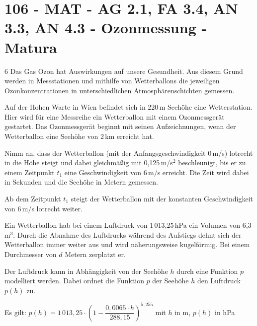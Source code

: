 \section{106 - MAT - AG 2.1, FA 3.4, AN 3.3, AN 4.3 - Ozonmessung - Matura}

\begin{langesbeispiel}\item[6] %
Das Gas Ozon hat Auswirkungen auf unsere Gesundheit. Aus diesem Grund werden in Messstationen und mithilfe von Wetterballons die jeweiligen Ozonkonzentrationen in unterschiedlichen Atmosphärenschichten gemessen.%

\begin{aufgabenstellung}
\item Auf der Hohen Warte in Wien befindet sich in 220\,m Seehöhe eine Wetterstation. Hier wird für eine Messreihe ein Wetterballon mit einem Ozonmessgerät gestartet. Das Ozonmessgerät beginnt mit seinen Aufzeichnungen, wenn der Wetterballon eine Seehöhe von 2\,km erreicht hat.

Nimm an, dass der Wetterballon (mit der Anfangsgeschwindigkeit 0\,m/s) lotrecht in die Höhe steigt und dabei gleichmäßig mit 0,125\,m/s$^2$ beschleunigt, bis er zu einem Zeitpunkt $t_1$ eine Geschwindigkeit von 6\,m/s erreicht. Die Zeit wird dabei in Sekunden und die Seehöhe in Metern gemessen.%


Ab dem Zeitpunkt $t_1$ steigt der Wetterballon mit der konstanten Geschwindigkeit von 6\,m/s lotrecht weiter.


\item Ein Wetterballon hab bei einem Luftdruck von 1\,013,25\,hPa ein Volumen von 6,3\,m$^3$. Durch die Abnahme des Luftdrucks während des Aufstiegs dehnt sich der Wetterballon immer weiter aus und wird näherungsweise kugelförmig. Bei einem Durchmesser von $d$ Metern zerplatzt er.

Der Luftdruck kann in Abhängigkeit von der Seehöhe $h$ durch eine Funktion $p$ modelliert werden. Dabei ordnet die Funktion $p$ der Seehöhe $h$ den Luftdruck $p(h)$ zu.

Es gilt: $p(h)=1\,013,25\cdot\left(1-\dfrac{0,0065\cdot h}{288,15}\right)^{5,255}$ mit $h$ in m, $p(h)$ in hPa


\end{aufgabenstellung}
\end{langesbeispiel}
